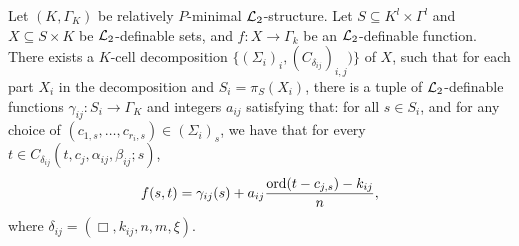 \begin{thm}\label{thm:partialprep} 
Let $(K,\Gamma_K)$ be relatively $P$-minimal $\mathcal{L}_2$-structure. Let $S\subseteq K^l\times\Gamma^l$ and $X \subseteq S \times K$ be $\mathcal{L}_2$-definable sets, and $f:X\rightarrow \Gamma_k$ be an $\mathcal{L}_2$-definable function. There exists a $K$-cell decomposition $\{(\Sigma_i)_{i}, (C_{\delta_{ij}})_{i,j})\}$ of $X$, such that for each part $X_i$ in the decomposition and $S_i=\pi_S(X_i)$, there is a tuple of $\mathcal{L}_2$-definable functions $\gamma_{ij}:S_i\to\Gamma_K$ and integers $a_{ij}$ satisfying that: for all $s\in S_i$, and for any choice of  $(c_{1,s}, \ldots, c_{r_i,s}) \in (\Sigma_i)_s$, we have that for every $t \in C_{\delta_{ij}}(t,c_j,\alpha_{ij},\beta_{ij};s)$, 
\[f(s,t) = \gamma_{ij}(s) + a_{ij}\frac{\operatorname{ord}(t-c_{j,s})-k_{ij}}{n},\]
where $\delta_{ij} =(\Box, k_{ij},n,m,\xi)$.
\end{thm}


